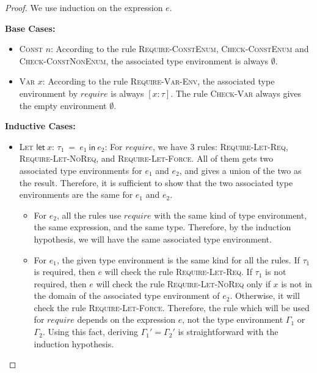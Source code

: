 \documentclass[peerreview, 10pt]{IEEEtran}
\newcommand{\lett}[4]{\ensuremath{\mathsf{let}\ #1\mathsf{:}\,#2\ \mathsf{=}\ #3\ \mathsf{in}\ #4}}
\begin{document}
\begin{proof}
    We use induction on the expression $e$.

    \textbf{Base Cases:}
    \begin{itemize}
        \item \textsc{Const} $n$: According to the rule \textsc{Require-ConstEnum}, \textsc{Check-ConstEnum} and \textsc{Check-ConstNonEnum}, the associated type environment is always $\emptyset$.
        \item \textsc{Var} $x$: According to the rule \textsc{Require-Var-Env}, the associated type environment by $require$ is always $[x:\tau]$. The rule \textsc{Check-Var} always gives the empty environment $\emptyset$.
    \end{itemize}

    \textbf{Inductive Cases:}
    \begin{itemize}
        \item \textsc{Let} \lett{x}{\tau_1}{e_1}{e_2}: For $require$, we have 3 rules: \textsc{Require-Let-Req}, \textsc{Require-Let-NoReq}, and \textsc{Require-Let-Force}. All of them gets two associated type environments for $e_1$ and $e_2$, and gives a union of the two as the result. Therefore, it is sufficient to show that the two associated type environments are the same for $e_1$ and $e_2$.
        \begin{itemize}
            \item For $e_2$, all the rules use $require$ with the same kind of type environment, the same expression, and the same type. Therefore, by the induction hypothesis, we will have the same associated type environment.
            \item For $e_1$, the given type environment is the same kind for all the rules. If $\tau_1$ is required, then $e$ will check the rule \textsc{Require-Let-Req}. If $\tau_1$ is not required, then $e$ will check the rule \textsc{Require-Let-NoReq} only if $x$ is not in the domain of the associated type environment of $e_2$. Otherwise, it will check the rule \textsc{Require-Let-Force}. Therefore, the rule which will be used for $require$ depends on the expression $e$, not the type environment $\Gamma_1$ or $\Gamma_2$. Using this fact, deriving $\Gamma_1'=\Gamma_2'$ is straightforward with the induction hypothesis.
        \end{itemize}


\end{itemize}
\end{proof}
\end{document}
